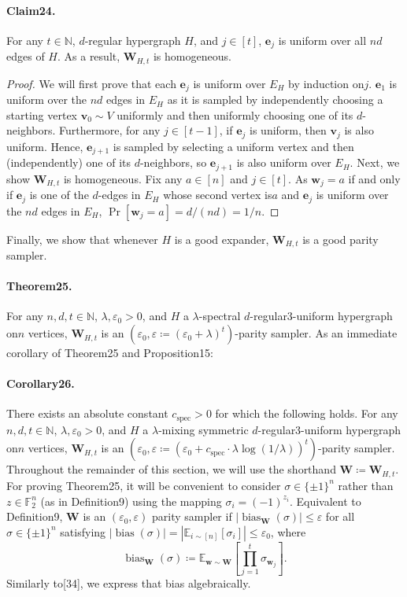 \documentclass[10pt,a4paper]{article}
\DeclareMathOperator{\bias}{bias}
\begin{document}
\paragraph{Claim24.} For any $t\in\mathbb N$, $d$-regular hypergraph $H$, and $j\in[t]$, $\mathbf e_j$ is uniform over all $nd$ edges of $H$. As a result, $\mathbf W_{H,t}$ is homogeneous.
\begin{proof}
We will first prove that each $\mathbf e_j$ is uniform over $E_H$ by induction on$j$. $\mathbf e_1$ is uniform over the $nd$ edges in $E_H$ as it is sampled by independently choosing a starting vertex $\mathbf v_0\sim V$ uniformly and then uniformly choosing one of its $d$-neighbors. Furthermore, for any $j\in[t-1]$, if $\mathbf e_j$ is uniform, then $\mathbf v_j$ is also uniform. Hence, $\mathbf e_{j+1}$ is sampled by selecting a uniform vertex and then (independently) one of its $d$-neighbors, so $\mathbf e_{j+1}$ is also uniform over $E_H$.
Next, we show $\mathbf W_{H,t}$ is homogeneous. Fix any $a\in[n]$ and $j\in[t]$. As $\mathbf w_j=a$ if and only if $\mathbf e_j$ is one of the $d$-edges in $E_H$ whose second vertex is$a$ and $\mathbf e_j$ is uniform over the $nd$ edges in $E_H$, $\Pr[\mathbf w_j=a]=d/(nd)=1/n$.
\end{proof}
Finally, we show that whenever $H$ is a good expander, $\mathbf W_{H,t}$ is a good parity sampler.
\paragraph{Theorem25.} For any $n,d,t\in\mathbb N$, $\lambda,\varepsilon_0>0$, and $H$ a $\lambda$-spectral $d$-regular3-uniform hypergraph on$n$ vertices, $\mathbf W_{H,t}$ is an $(\varepsilon_0,\varepsilon\coloneqq(\varepsilon_0+\lambda)^t)$-parity sampler.
As an immediate corollary of Theorem25 and Proposition15:
\paragraph{Corollary26.} There exists an absolute constant $c_{\mathrm{spec}}>0$ for which the following holds. For any $n,d,t\in\mathbb N$, $\lambda,\varepsilon_0>0$, and $H$ a $\lambda$-mixing symmetric $d$-regular3-uniform hypergraph on$n$ vertices, $\mathbf W_{H,t}$ is an $(\varepsilon_0,\varepsilon\coloneqq(\varepsilon_0+c_{\mathrm{spec}}\cdot\lambda\log(1/\lambda))^t)$-parity sampler.
Throughout the remainder of this section, we will use the shorthand $\mathbf W\coloneqq\mathbf W_{H,t}$. For proving Theorem25, it will be convenient to consider $\sigma\in\{\pm1\}^n$ rather than $z\in\mathbb F_2^n$ (as in Definition9) using the mapping $\sigma_i=(-1)^{z_i}$. Equivalent to Definition9, $\mathbf W$ is an $(\varepsilon_0,\varepsilon)$ parity sampler if $|\bias_{\mathbf W}(\sigma)|\leq\varepsilon$ for all $\sigma\in\{\pm1\}^n$ satisfying $|\bias(\sigma)|=|\mathbb E_{i\sim[n]}[\sigma_i]|\leq\varepsilon_0$, where
\[\bias_{\mathbf W}(\sigma)\coloneqq\mathbb E_{\mathbf w\sim\mathbf W}\left[\prod_{j=1}^t\sigma_{\mathbf w_j}\right].\]
Similarly to[34], we express that bias algebraically.
\end{document}
